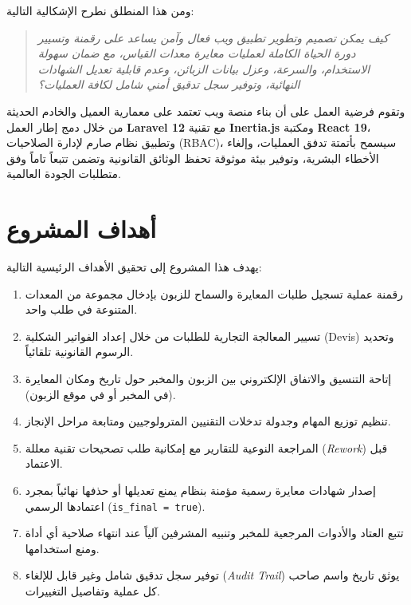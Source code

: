 \documentclass{bts-report-ar}
\begin{document}
ومن هذا المنطلق نطرح الإشكالية التالية:
\begin{quote}
\itshape
\og كيف يمكن تصميم وتطوير تطبيق ويب فعال وآمن يساعد على رقمنة وتسيير دورة الحياة الكاملة لعمليات معايرة معدات القياس، مع ضمان سهولة الاستخدام، والسرعة، وعزل بيانات الزبائن، وعدم قابلية تعديل الشهادات النهائية، وتوفير سجل تدقيق أمني شامل لكافة العمليات؟ \fg
\end{quote}

وتقوم فرضية العمل على أن بناء منصة ويب تعتمد على معمارية العميل والخادم الحديثة من خلال دمج إطار العمل \textbf{Laravel 12} مع تقنية \textbf{Inertia.js} ومكتبة \textbf{React 19}، وتطبيق نظام صارم لإدارة الصلاحيات (RBAC)، سيسمح بأتمتة تدفق العمليات، وإلغاء الأخطاء البشرية، وتوفير بيئة موثوقة تحفظ الوثائق القانونية وتضمن تتبعاً تاماً وفق متطلبات الجودة العالمية.

\section*{أهداف المشروع}
يهدف هذا المشروع إلى تحقيق الأهداف الرئيسية التالية:
\begin{enumerate}
  \item رقمنة عملية تسجيل طلبات المعايرة والسماح للزبون بإدخال مجموعة من المعدات المتنوعة في طلب واحد.
  \item تسيير المعالجة التجارية للطلبات من خلال إعداد الفواتير الشكلية (Devis) وتحديد الرسوم القانونية تلقائياً.
  \item إتاحة التنسيق والاتفاق الإلكتروني بين الزبون والمخبر حول تاريخ ومكان المعايرة (في المخبر أو في موقع الزبون).
  \item تنظيم توزيع المهام وجدولة تدخلات التقنيين المترولوجيين ومتابعة مراحل الإنجاز.
  \item المراجعة النوعية للتقارير مع إمكانية طلب تصحيحات تقنية معللة (\textit{Rework}) قبل الاعتماد.
  \item إصدار شهادات معايرة رسمية مؤمنة بنظام يمنع تعديلها أو حذفها نهائياً بمجرد اعتمادها الرسمي (\texttt{is\_final = true}).
  \item تتبع العتاد والأدوات المرجعية للمخبر وتنبيه المشرفين آلياً عند انتهاء صلاحية أي أداة ومنع استخدامها.
  \item توفير سجل تدقيق شامل وغير قابل للإلغاء (\textit{Audit Trail}) يوثق تاريخ واسم صاحب كل عملية وتفاصيل التغييرات.
\end{enumerate}
\end{document}
